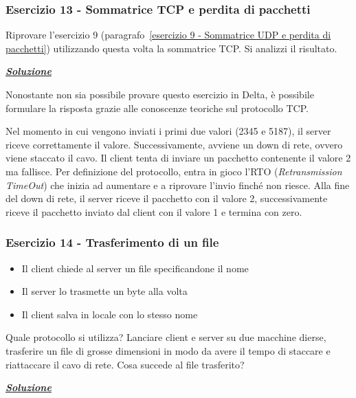 \documentclass[a4paper]{article}
\begin{document}
	\subsubsection{Esercizio 13 - Sommatrice TCP e perdita di pacchetti}
	
	Riprovare l'esercizio 9 (paragrafo~\ref{esercizio 9 - Sommatrice UDP e perdita di pacchetti}) utilizzando questa volta la sommatrice TCP. Si analizzi il risultato.\newline
	
	\noindent
	\textcolor{Green4}{\textbf{\emph{\underline{Soluzione}}}}\newline
	
	\noindent
	Nonostante non sia possibile provare questo esercizio in Delta, è possibile formulare la risposta grazie alle conoscenze teoriche sul protocollo TCP.\newline
	
	\noindent
	Nel momento in cui vengono inviati i primi due valori (2345 e 5187), il server riceve correttamente il valore. Successivamente, avviene un down di rete, ovvero viene staccato il cavo. Il client tenta di inviare un pacchetto contenente il valore 2 ma fallisce. Per definizione del protocollo, entra in gioco l'RTO (\emph{Retransmission TimeOut}) che inizia ad aumentare e a riprovare l'invio finché non riesce. Alla fine del down di rete, il server riceve il pacchetto con il valore 2, successivamente riceve il pacchetto inviato dal client con il valore 1 e termina con zero.\newpage

	\subsubsection{Esercizio 14 - Trasferimento di un file}
	
	\begin{itemize}
		\item Il client chiede al server un file specificandone il nome
		\item Il server lo trasmette un byte alla volta
		\item Il client salva in locale con lo stesso nome
	\end{itemize}
	Quale protocollo si utilizza? Lanciare client e server su due macchine dierse, trasferire un file di grosse dimensioni in modo da avere il tempo di staccare e riattaccare il cavo di rete. Cosa succede al file trasferito?\newline
	
	\noindent
	\textcolor{Green4}{\underline{\textbf{\emph{Soluzione}}}}\newline
	
\end{document}
